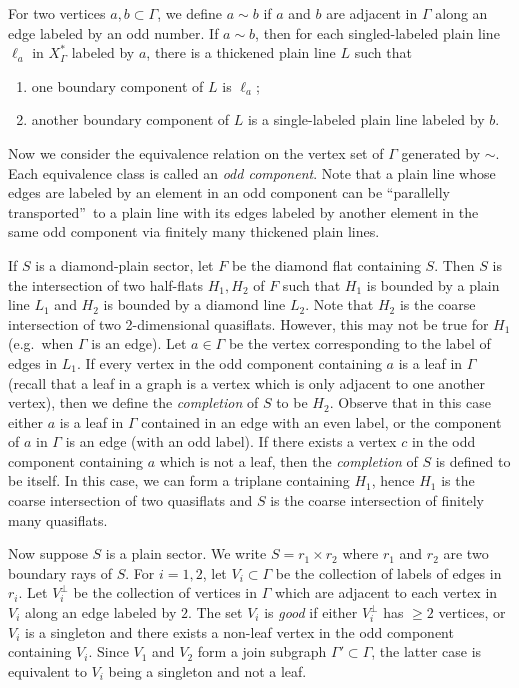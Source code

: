 \documentclass[11pt]{amsart}
\theoremstyle{definition}
\newcommand{\Xa}{X^{\ast}}
\begin{document}
For two vertices $a,b\subset\Gamma$, we define $a\sim b$ if $a$ and $b$ are adjacent in $\Gamma$ along an edge labeled by an odd number. If $a\sim b$, then for each singled-labeled plain line $\ell_a$ in $\Xa_\Gamma$ labeled by $a$, there is a thickened plain line $L$ such that 
\begin{enumerate}
	\item one boundary component of $L$ is $\ell_a$;
	\item another boundary component of $L$ is a single-labeled plain line labeled by $b$.
\end{enumerate}
Now we consider the equivalence relation on the vertex set of $\Gamma$ generated by $\sim$. Each equivalence class is called an \emph{odd component}. Note that a plain line whose edges are labeled by an element in an odd component can be \textquotedblleft parallelly transported\textquotedblright\ to a plain line with its edges labeled by another element in the same odd component via finitely many thickened plain lines.

If $S$ is a diamond-plain sector, let $F$ be the diamond flat containing $S$. Then $S$ is the intersection of two half-flats $H_1,H_2$ of $F$ such that $H_1$ is bounded by a plain line $L_1$ and $H_2$ is bounded by a diamond line $L_2$. Note that $H_2$ is the coarse intersection of two 2-dimensional quasiflats. However, this may not be true for $H_1$ (e.g.\ when $\Gamma$ is an edge). Let $a\in\Gamma$ be the vertex corresponding to the label of edges in $L_1$. If every vertex in the odd component containing $a$ is a leaf in $\Gamma$ (recall that a leaf in a graph is a vertex which is only adjacent to one another vertex), then we define the \emph{completion} of $S$ to be $H_2$. 
Observe that in this case either $a$ is a leaf in $\Gamma$ contained in an edge with an even label, or the component of
$a$ in $\Gamma$ is an edge (with an odd label).
If there exists a vertex $c$ in the odd component containing $a$ which is not a leaf, then the \emph{completion} of $S$ is defined to be itself. In this case, we can form a triplane containing $H_1$, hence $H_1$ is the coarse intersection of two quasiflats and $S$ is the coarse intersection of finitely many quasiflats.

Now suppose $S$ is a plain sector. We write $S=r_1\times r_2$ where $r_1$ and $r_2$ are two boundary rays of $S$. For $i=1,2$, let $V_i\subset\Gamma$ be the collection of labels of edges in $r_i$. Let $V^{\perp}_i$ be the collection of vertices in $\Gamma$ which are adjacent to each vertex in $V_i$ along an edge labeled by $2$. The set $V_i$ is \emph{good} if either $V^{\perp}_i$ has $\ge 2$ vertices, or $V_i$ is a singleton and there exists a non-leaf vertex in the odd component containing $V_i$. Since $V_1$ and $V_2$ form a join subgraph $\Gamma'\subset\Gamma$, the latter case is equivalent to $V_i$ being a singleton and not a leaf. 
\end{document}
